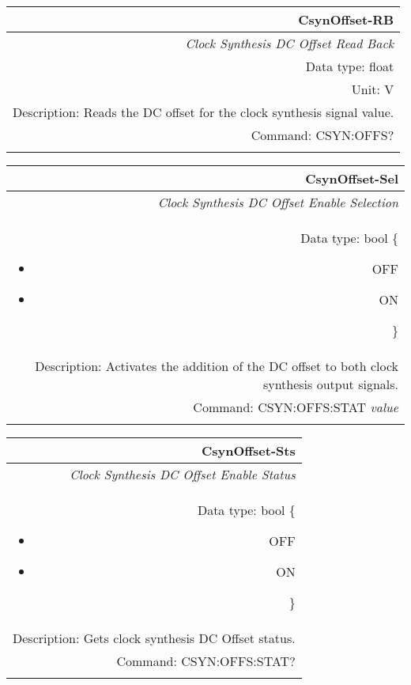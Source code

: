 \documentclass[openany]{article}
\begin{document}
		\begin{tabular}{N}
			\hline
			\bfseries CsynOffset-RB \\ \hline
			\emph{Clock Synthesis DC Offset Read Back} \\
			Data type: float \\
			Unit: V \\
			Description: Reads the DC offset for the clock synthesis signal value. \\
			Command: CSYN:OFFS? \\
			\\

		\end{tabular}


		\begin{tabular}{N}
			\hline
			\bfseries CsynOffset-Sel \\ \hline
			\emph{Clock Synthesis DC Offset Enable Selection} \\
			Data type: bool \{\begin{itemize}[noitemsep]
				\small
				\item[] OFF
				\item[] ON
			\end{itemize}\} \\
			Description: Activates the addition of the DC offset to both clock synthesis output signals. \\
			Command: CSYN:OFFS:STAT \emph{value} \\
			\\

		\end{tabular}


		\begin{tabular}{N}
			\hline
			\bfseries CsynOffset-Sts \\ \hline
			\emph{Clock Synthesis DC Offset Enable Status} \\
			Data type: bool \{\begin{itemize}[noitemsep]
				\small
				\item[] OFF
				\item[] ON
			\end{itemize}\} \\
			Description: Gets clock synthesis DC Offset status. \\
			Command: CSYN:OFFS:STAT? \\
			\\
			
		\end{tabular}


\end{document}
